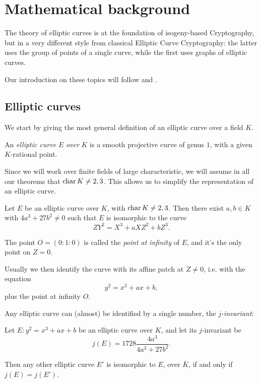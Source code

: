 \chapter{Mathematical background}

The theory of elliptic curves is at the foundation of isogeny-based Cryptography, but in a very different style from classical Elliptic Curve Cryptography: the latter uses the group of points of a single curve, while the first uses graphs of elliptic curves.

Our introduction on these topics will follow \cite{Silverman} and \cite{DeFeo_intro}.

\section{Elliptic curves}

We start by giving the most general definition of an elliptic curve over a field $K$.

\begin{definition}
    An \emph{elliptic curve} $E$ \emph{over} $K$ is a smooth projective curve of genus $1$, with a given $K$-rational point.
\end{definition}

Since we will work over finite fields of large characteristic, we will assume in all our theorems that $\operatorname{char} K\neq 2,3$. This allows us to simplify the representation of an elliptic curve.

\begin{proposition}
    Let $E$ be an elliptic curve over $K$, with $\operatorname{char} K\neq 2,3$. Then there exist $a,b\in K$ with $4a^3+27b^2\neq0$ such that $E$ is isomorphic to the curve $$ZY^2=X^3+aXZ^2+bZ^3.$$
    
    The point $O=(0:1:0)$ is called the \emph{point at infinity} of $E$, and it's the only point on $Z=0$.
\end{proposition}

Usually we then identify the curve with its affine patch at $Z\neq0$, i.e. with the equation $$y^2=x^3+ax+b,$$
plus the point at infinity $O$.

Any elliptic curve can (almost) be identified by a single number, the \emph{$j$-invariant}:
\begin{theorem}
    Let $E:y^2=x^3+ax+b$ be an elliptic curve over $K$, and let its $j$-invariant be $$j(E)=1728\frac{4a^3}{4a^3+27b^2}.$$
    
    Then any other elliptic curve $E'$ is isomorphic to $E$, over $\bar K$, if and only if $j(E)=j(E')$.
\end{theorem}

